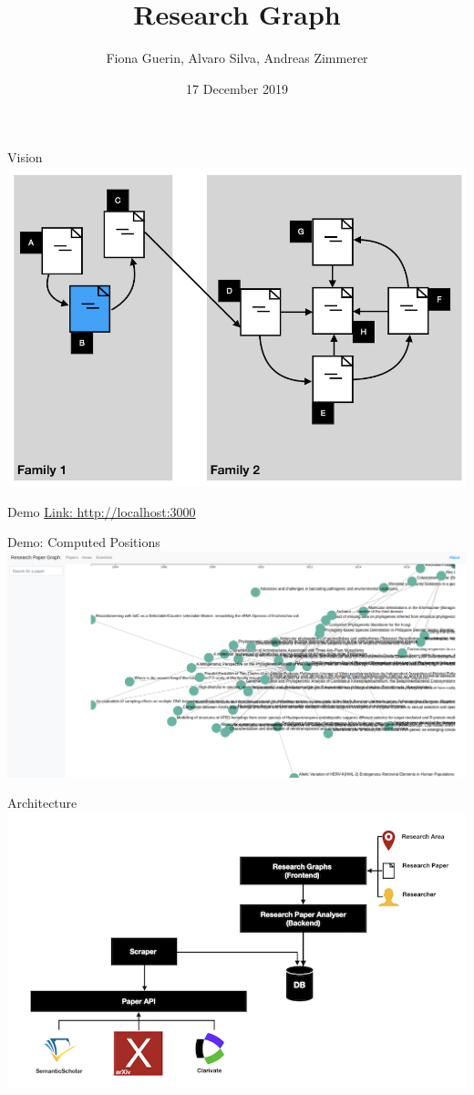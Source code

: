 \documentclass{beamer}
\title[Research Graph]{Research Graph}
\author[Guerin, Silva, Zimmerer]{Fiona Guerin, Alvaro Silva, Andreas Zimmerer}
\institute{Technical University of Munich}
\date{17 December 2019}
\begin{document}
\maketitle

\begin{frame}{Vision}
    \includegraphics{img_02.png}
\end{frame}

\begin{frame}{Demo}
\url{Link: http://localhost:3000}
\end{frame}

\begin{frame}{Demo: Computed Positions}
    \includegraphics{graph_computed_positions.png}
\end{frame}

\begin{frame}{Architecture}
    \includegraphics{img_03.png}
\end{frame}
\end{document}
